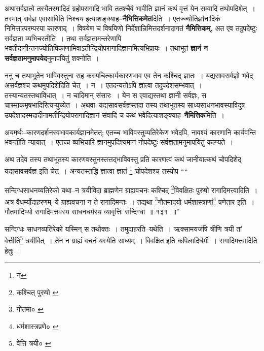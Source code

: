 \documentclass[article,12pt,a4paper]{memoir}
\begin{document}
	  \pstart अथासर्वज्ञत्वे तस्यैतस्मादिदं ग्रहोपरागादि भावि ततश्चैवं भावीति ज्ञानं कथं वृत्तं येन सम्वादि तथोपदिशेत् । तस्मात् सर्वज्ञ एवासाविति निश्चय इत्याशङ्क्याह--\textbf{नैभित्तिकमेत}दिति । एतज्ज्योतिर्ज्ञानादिकं निमित्तात्परम्परया कारणाद् । विषयेण च विषयिणो निर्देशान्निमित्तदर्शनादागतं \textbf{नैमित्तिकम्,} अत एव तदुपदेष्टुः सर्वज्ञता व्यभिचरतीति । तथा सर्वज्ञतामन्तरेणापि भवतीदानीन्तनज्योतिषिकाणामिवाऽतीन्द्रियोपरागादिज्ञानमित्यभिप्रायः । तथाभूतं \textbf{ज्ञानं न सर्वज्ञतामनुमापयेद}नुमापयितुं शक्नोति ।
	\pend
      

	  \pstart ननु च तथाभूतेन भाविवस्तुना सह कस्यचित्कार्यकारणभाव एव तेन कश्चिद् ज्ञातः । यद्य\leavevmode{}सावसर्वज्ञो भवेद् असर्वज्ञश्च कथमुपदिशेदिति चेत् । न । एतदन्यतोऽपि ज्ञात्वा तदुपदेशसम्भवात् । तस्यान्यतस्तथाविधात् । न चादिमान् संसारः । येन स एवाद्यस्तथा ज्ञानी सर्वज्ञः, स चास्माकमृषभादिरित्यप्युच्येत । अथवा--यद्यसावसर्वज्ञस्तदा तस्य तथाभूतस्य साध्यसाधनभावस्याविदुष उपदेशादस्मदादीनामतीन्द्रियोपरागादिज्ञानं संवादि च कथं भवेदित्याशङ्क्याह--\textbf{नैमित्तिक}मिति ।
	\pend
      

	  \pstart अयमर्थः--कारणदर्शनस्वभावकार्यज्ञानमेतत्; एतच्च भाविवस्तुव्यतिरेकेण भवेदपि, नावश्यं कारणानि कार्यवन्ति भवन्तीति न्यायात् । एतच्च व्यभिचारि ज्ञानमुपदिश्यमानं नोपदेष्टुः सर्वज्ञतामनुमापयितुं कल्प्यते ।
	\pend
      

	  \pstart अथ तदेव तस्य तथाभूतस्य कारणवस्तुनस्तत्तद्भाविवस्तु प्रति कारणत्वं कथं जानीयात्कथं चोपदिशेद् यद्यसावसर्वज्ञ इति चेत् । अन्यतस्तद्धि ज्ञात्वा ज्ञातं \footnote{नं} चोपदेशश्च तस्योप  \leavevmode{} ““
	  
	सन्दिग्धसाधनव्यतिरेको यथा--न त्रयीविदा ब्राह्मणेन ग्राह्यवचनः कश्चिद् \footnote{कश्चित् पुरुषो \cite{dp-msB} \cite{dp-edP} \cite{dp-edH} \cite{dp-edE}}\-विवक्षितः पुरुषो रागादिमत्त्वादिति । अत्र वैधर्म्योदाहरणम्--ये ग्राह्यवचना न ते रागादिमन्तः । तद्यथा \footnote{गोतमा० \cite{dp-msD}}\-गौतमादयो धर्मशास्त्राणां\footnote{धर्मशास्त्रप्रणे० \cite{dp-msC}} प्रणेतार इति । गौतमादिभ्यो रागादिमत्तवस्य साधनधर्मस्य व्यावृत्तिः सन्दिग्धा ॥ १३१ ॥” 
	  
	सन्दिग्धः साधनव्यतिरेको यस्मिन् स तथोक्तः । तमुदाहरति--यथेति । ऋक्सामयजंषि त्रीणि त्रयी तां वेत्तीति\footnote{वेत्ति त्रयी० \cite{dp-msA} \cite{dp-msB} \cite{dp-msD} \cite{dp-edP} \cite{dp-edH} \cite{dp-edE} \cite{dp-edN}} त्रयीवित् । तेन न ग्राह्यं वचनं यस्येति साध्यम् । विवक्षित इति कपिलादिर्धर्मी । रागादिमत्त्वादिति हेतुः । 
	  
\end{document}
